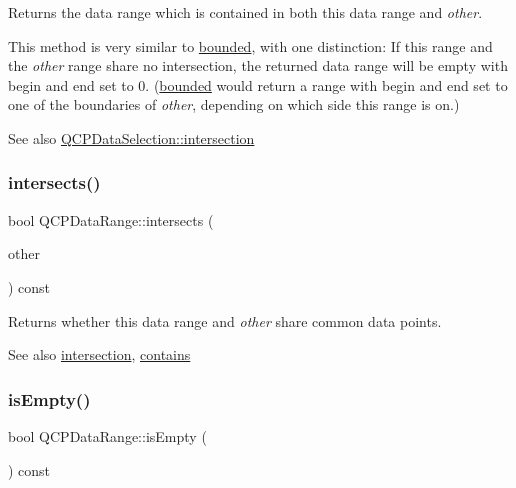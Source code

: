 Returns the data range which is contained in both this data range and {\itshape other}.

This method is very similar to \hyperlink{class_q_c_p_data_range_a93529421d12fdd3a8bdb2b8061936352}{bounded}, with one distinction\+: If this range and the {\itshape other} range share no intersection, the returned data range will be empty with begin and end set to 0. (\hyperlink{class_q_c_p_data_range_a93529421d12fdd3a8bdb2b8061936352}{bounded} would return a range with begin and end set to one of the boundaries of {\itshape other}, depending on which side this range is on.)

\begin{DoxySeeAlso}{See also}
\hyperlink{class_q_c_p_data_selection_af5267ced53687561367105ee77b874ab}{Q\+C\+P\+Data\+Selection\+::intersection} 
\end{DoxySeeAlso}
\mbox{\label{class_q_c_p_data_range_a8a1c437f9beffd55621f48f961d7f679}} 
\subsubsection{\texorpdfstring{intersects()}{intersects()}}
{\footnotesize\ttfamily bool Q\+C\+P\+Data\+Range\+::intersects (\begin{DoxyParamCaption}\item[{const \hyperlink{class_q_c_p_data_range}{Q\+C\+P\+Data\+Range} \&}]{other }\end{DoxyParamCaption}) const}

Returns whether this data range and {\itshape other} share common data points.

\begin{DoxySeeAlso}{See also}
\hyperlink{class_q_c_p_data_range_a84e1e03129dd52528efb4bac18d30183}{intersection}, \hyperlink{class_q_c_p_data_range_a13ca398776374a3160aa85433718b812}{contains} 
\end{DoxySeeAlso}
\mbox{\label{class_q_c_p_data_range_ac32e53fc05d6cd2eac96b96a7265d3b8}} 
\subsubsection{\texorpdfstring{is\+Empty()}{isEmpty()}}
{\footnotesize\ttfamily bool Q\+C\+P\+Data\+Range\+::is\+Empty (\begin{DoxyParamCaption}{ }\end{DoxyParamCaption}) const\hspace{0.3cm}{\ttfamily [inline]}}

